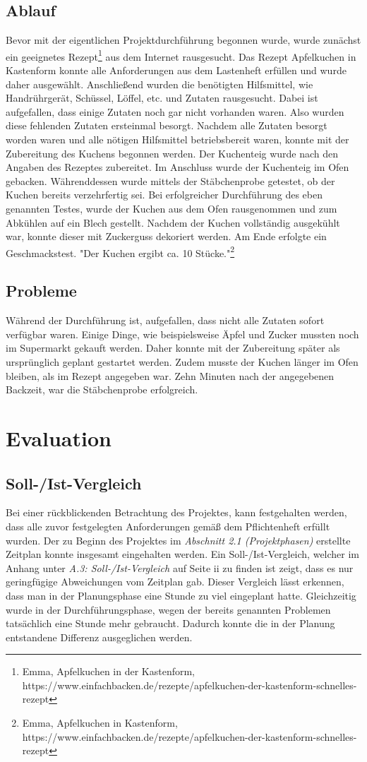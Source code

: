 \subsection{Ablauf}
Bevor mit der eigentlichen Projektdurchführung begonnen wurde, wurde zunächst ein geeignetes Rezept\footnote{Emma, Apfelkuchen in der Kastenform, https://www.einfachbacken.de/rezepte/apfelkuchen-der-kastenform-schnelles-rezept} aus dem Internet rausgesucht. Das Rezept Apfelkuchen in Kastenform konnte alle Anforderungen aus dem Lastenheft erfüllen und wurde daher ausgewählt.
Anschließend wurden die benötigten Hilfsmittel, wie Handrührgerät, Schüssel, Löffel, etc. und Zutaten rausgesucht. Dabei ist aufgefallen, dass einige Zutaten
noch gar nicht vorhanden waren. Also wurden diese fehlenden Zutaten ersteinmal besorgt. Nachdem alle Zutaten besorgt worden waren und alle nötigen Hilfsmittel betriebsbereit waren, konnte mit der
Zubereitung des Kuchens begonnen werden. Der Kuchenteig wurde nach den Angaben des Rezeptes zubereitet. Im Anschluss wurde der Kuchenteig im Ofen gebacken.
Währenddessen wurde mittels der Stäbchenprobe getestet, ob der Kuchen bereits verzehrfertig sei. Bei erfolgreicher Durchführung des eben genannten Testes, wurde der Kuchen aus dem Ofen rausgenommen und zum Abkühlen auf ein Blech gestellt.
Nachdem der Kuchen vollständig ausgekühlt war, konnte dieser mit Zuckerguss dekoriert werden. Am Ende erfolgte ein Geschmackstest. "Der Kuchen ergibt ca. 10 Stücke."\footnote{Emma, Apfelkuchen in Kastenform, https://www.einfachbacken.de/rezepte/apfelkuchen-der-kastenform-schnelles-rezept}
\subsection{Probleme}
Während der Durchführung ist, aufgefallen, dass nicht alle Zutaten sofort verfügbar waren. Einige Dinge, wie beispielsweise Äpfel und Zucker mussten noch im Supermarkt gekauft werden. Daher konnte mit der Zubereitung später als ursprünglich geplant gestartet werden.
Zudem musste der Kuchen länger im Ofen bleiben, als im Rezept angegeben war. Zehn Minuten nach der angegebenen Backzeit, war die Stäbchenprobe erfolgreich.
\section{Evaluation}
\subsection{Soll-/Ist-Vergleich}
Bei einer rückblickenden Betrachtung des Projektes, kann festgehalten werden, dass alle zuvor festgelegten Anforderungen gemäß dem Pflichtenheft erfüllt wurden. Der zu Beginn des Projektes im \emph{Abschnitt 2.1 (Projektphasen)} erstellte Zeitplan konnte insgesamt eingehalten werden.
Ein Soll-/Ist-Vergleich, welcher im Anhang unter \emph{A.3: Soll-/Ist-Vergleich} auf Seite ii zu finden ist zeigt, dass es nur geringfügige Abweichungen vom Zeitplan gab. Dieser Vergleich lässt erkennen, dass man in der Planungsphase eine Stunde zu viel eingeplant hatte. Gleichzeitig wurde in der Durchführungsphase, wegen der bereits genannten Problemen tatsächlich eine Stunde mehr gebraucht.
Dadurch konnte die in der Planung entstandene Differenz ausgeglichen werden.
